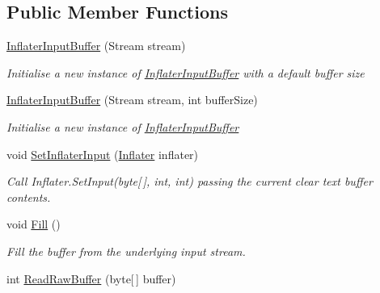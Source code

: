 \subsection*{Public Member Functions}
\begin{DoxyCompactItemize}
\item 
\hyperlink{class_i_c_sharp_code_1_1_sharp_zip_lib_1_1_zip_1_1_compression_1_1_streams_1_1_inflater_input_buffer_a29ccbb3fa15cead58316762cfa37bd52}{Inflater\+Input\+Buffer} (Stream stream)
\begin{DoxyCompactList}\small\item\em Initialise a new instance of \hyperlink{class_i_c_sharp_code_1_1_sharp_zip_lib_1_1_zip_1_1_compression_1_1_streams_1_1_inflater_input_buffer}{Inflater\+Input\+Buffer} with a default buffer size \end{DoxyCompactList}\item 
\hyperlink{class_i_c_sharp_code_1_1_sharp_zip_lib_1_1_zip_1_1_compression_1_1_streams_1_1_inflater_input_buffer_acb49a5794ba884055d505b84659b583d}{Inflater\+Input\+Buffer} (Stream stream, int buffer\+Size)
\begin{DoxyCompactList}\small\item\em Initialise a new instance of \hyperlink{class_i_c_sharp_code_1_1_sharp_zip_lib_1_1_zip_1_1_compression_1_1_streams_1_1_inflater_input_buffer}{Inflater\+Input\+Buffer} \end{DoxyCompactList}\item 
void \hyperlink{class_i_c_sharp_code_1_1_sharp_zip_lib_1_1_zip_1_1_compression_1_1_streams_1_1_inflater_input_buffer_ab6122d2c0162fcb65003978234151851}{Set\+Inflater\+Input} (\hyperlink{class_i_c_sharp_code_1_1_sharp_zip_lib_1_1_zip_1_1_compression_1_1_inflater}{Inflater} inflater)
\begin{DoxyCompactList}\small\item\em Call Inflater.\+Set\+Input(byte\mbox{[}$\,$\mbox{]}, int, int) passing the current clear text buffer contents. \end{DoxyCompactList}\item 
void \hyperlink{class_i_c_sharp_code_1_1_sharp_zip_lib_1_1_zip_1_1_compression_1_1_streams_1_1_inflater_input_buffer_a8a952d8bf72896646040449cbc5106e8}{Fill} ()
\begin{DoxyCompactList}\small\item\em Fill the buffer from the underlying input stream. \end{DoxyCompactList}\item 
int \hyperlink{class_i_c_sharp_code_1_1_sharp_zip_lib_1_1_zip_1_1_compression_1_1_streams_1_1_inflater_input_buffer_a39f57266c6bd03228ff0a46ec3d73943}{Read\+Raw\+Buffer} (byte\mbox{[}$\,$\mbox{]} buffer)

\end{DoxyCompactItemize}
